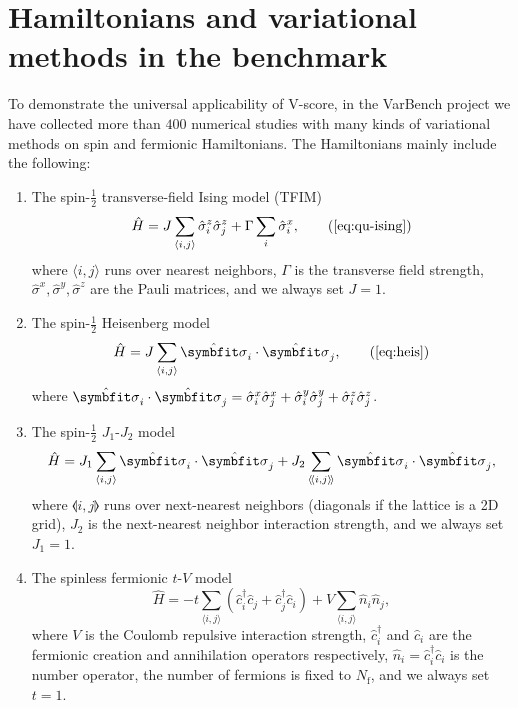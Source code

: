 \section{Hamiltonians and variational methods in the benchmark}

To demonstrate the universal applicability of V-score, in the VarBench project we have collected more than $400$ numerical studies with many kinds of variational methods on spin and fermionic Hamiltonians. The Hamiltonians mainly include the following:
\begin{enumerate}
\item The spin-$\frac{1}{2}$ transverse-field Ising model (TFIM)
\begin{equation}
\hat{H} = J \sum_{\langle i, j \rangle} \hat{\sigma}^z_i \hat{\sigma}^z_j
+ \Gamma \sum_i \hat{\sigma}^x_i,
\tag{\ref{eq:qu-ising}}
\end{equation}
where $\langle i, j \rangle$ runs over nearest neighbors, $\Gamma$ is the transverse field strength, $\hat{\sigma}^x, \hat{\sigma}^y, \hat{\sigma}^z$ are the Pauli matrices, and we always set $J = 1$.

\item The spin-$\frac{1}{2}$ Heisenberg model
\begin{equation}
\hat{H} = J \sum_{\langle i, j \rangle} \hat{\vsi}_i \cdot \hat{\vsi}_j,
\tag{\ref{eq:heis}}
\end{equation}
where $\hat{\vsi}_i \cdot \hat{\vsi}_j = \hat{\sigma}^x_i \hat{\sigma}^x_j + \hat{\sigma}^y_i \hat{\sigma}^y_j + \hat{\sigma}^z_i \hat{\sigma}^z_j$.

\item The spin-$\frac{1}{2}$ $J_1$-$J_2$ model
\begin{equation}
\hat{H} = J_1 \sum_{\langle i, j \rangle} \hat{\vsi}_i \cdot \hat{\vsi}_j
+ J_2 \sum_{\llangle i, j \rrangle} \hat{\vsi}_i \cdot \hat{\vsi}_j,
\end{equation}
where $\llangle i, j \rrangle$ runs over next-nearest neighbors (diagonals if the lattice is a 2D grid), $J_2$ is the next-nearest neighbor interaction strength, and we always set $J_1 = 1$.

\item The spinless fermionic $t$-$V$ model
\begin{equation}
\hat{H} = -t \sum_{\langle i, j \rangle} \left( \hat{c}^\dagger_i \hat{c}_j + \hat{c}^\dagger_j \hat{c}_i \right)
+ V \sum_{\langle i, j \rangle} \hat{n}_i \hat{n}_j,
\end{equation}
where $V$ is the Coulomb repulsive interaction strength, $\hat{c}^\dagger_i$ and $\hat{c}_i$ are the fermionic creation and annihilation operators respectively, $\hat{n}_i = \hat{c}^\dagger_i \hat{c}_i$ is the number operator, the number of fermions is fixed to $N_\text{f}$, and we always set $t = 1$.


\end{enumerate}

